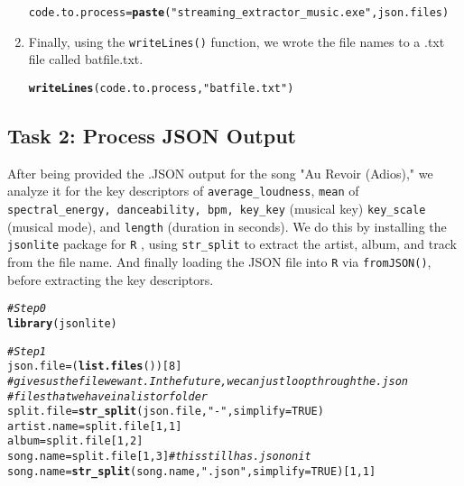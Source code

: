 \documentclass{article}\usepackage[]{graphicx}\usepackage[]{xcolor}
\makeatletter
\newcommand{\hlnum}[1]{\textcolor[rgb]{0.686,0.059,0.569}{#1}}%
\newcommand{\hlsng}[1]{\textcolor[rgb]{0.192,0.494,0.8}{#1}}%
\newcommand{\hlcom}[1]{\textcolor[rgb]{0.678,0.584,0.686}{\textit{#1}}}%
\newcommand{\hldef}[1]{\textcolor[rgb]{0.345,0.345,0.345}{#1}}%
\newcommand{\hlkwb}[1]{\textcolor[rgb]{0.69,0.353,0.396}{#1}}%
\newcommand{\hlkwc}[1]{\textcolor[rgb]{0.333,0.667,0.333}{#1}}%
\newcommand{\hlkwd}[1]{\textcolor[rgb]{0.737,0.353,0.396}{\textbf{#1}}}%
\newenvironment{kframe}{%
 \def\at@end@of@kframe{}%
 \ifinner\ifhmode%
  \def\at@end@of@kframe{\end{minipage}}%
  \begin{minipage}{\columnwidth}%
 \fi\fi%
 \def\FrameCommand##1{\hskip\@totalleftmargin \hskip-\fboxsep
 \colorbox{shadecolor}{##1}\hskip-\fboxsep
     \hskip-\linewidth \hskip-\@totalleftmargin \hskip\columnwidth}%
 \MakeFramed {\advance\hsize-\width
   \@totalleftmargin\z@ \linewidth\hsize
   \@setminipage}}%
 {\par\unskip\endMakeFramed%
 \at@end@of@kframe}
\newenvironment{knitrout}{}{} %
\makeatother
\begin{document}
\begin{multicols}{2}
\begin{enumerate}[1.]
\begin{knitrout}
\begin{kframe}
\begin{alltt}
\hldef{code.to.process} \hlkwb{=} \hlkwd{paste}\hldef{(}\hlsng{"streaming_extractor_music.exe "}\hldef{, json.files)}
\end{alltt}
\end{kframe}
\end{knitrout}

\item Finally, using the \texttt{writeLines()} function, we wrote the file names to a .txt file called batfile.txt.

\begin{knitrout}\scriptsize
{}\color{fgcolor}\begin{kframe}
\begin{alltt}
\hlkwd{writeLines}\hldef{(code.to.process,} \hlsng{"batfile.txt"}\hldef{)}
\end{alltt}
\end{kframe}
\end{knitrout}
\end{enumerate}

\subsection{Task 2: Process JSON Output}
After being provided the .JSON output for the song "Au Revoir (Adios)," we analyze it for the key descriptors of \texttt{average\_loudness}, \texttt{mean} of \texttt{spectral\_energy, danceability, bpm, key\_key} (musical key) \texttt{key\_scale} (musical mode), and \texttt{length} (duration in seconds). We do this by installing the \texttt{jsonlite} package for \texttt{R} \citep{}, using \texttt{str\_split} to extract the artist, album, and track from the file name. And finally loading the JSON file into \texttt{R} via \texttt{fromJSON()}, before extracting the key descriptors.
\begin{knitrout}\scriptsize
{}\color{fgcolor}\begin{kframe}
\begin{alltt}
\hlcom{#Step 0}
\hlkwd{library}\hldef{(jsonlite)}

\hlcom{#Step 1}
\hldef{json.file} \hlkwb{=} \hldef{(}\hlkwd{list.files}\hldef{())[}\hlnum{8}\hldef{]}
\hlcom{#gives us the file we want. In the future, we can just loop through the .json}
\hlcom{#files that we have in a list or folder}
\hldef{split.file} \hlkwb{=} \hlkwd{str_split}\hldef{(json.file,} \hlsng{"-"}\hldef{,} \hlkwc{simplify} \hldef{=} \hlnum{TRUE}\hldef{)}
\hldef{artist.name} \hlkwb{=} \hldef{split.file[}\hlnum{1}\hldef{,} \hlnum{1}\hldef{]}
\hldef{album} \hlkwb{=} \hldef{split.file[}\hlnum{1}\hldef{,} \hlnum{2}\hldef{]}
\hldef{song.name} \hlkwb{=} \hldef{split.file[}\hlnum{1}\hldef{,} \hlnum{3}\hldef{]} \hlcom{#this still has .json on it}
\hldef{song.name} \hlkwb{=} \hlkwd{str_split}\hldef{(song.name,} \hlsng{".json"}\hldef{,} \hlkwc{simplify} \hldef{=} \hlnum{TRUE}\hldef{)[}\hlnum{1}\hldef{,}\hlnum{1}\hldef{]}


\end{alltt}
\end{kframe}
\end{knitrout}
\end{multicols}
\end{document}
